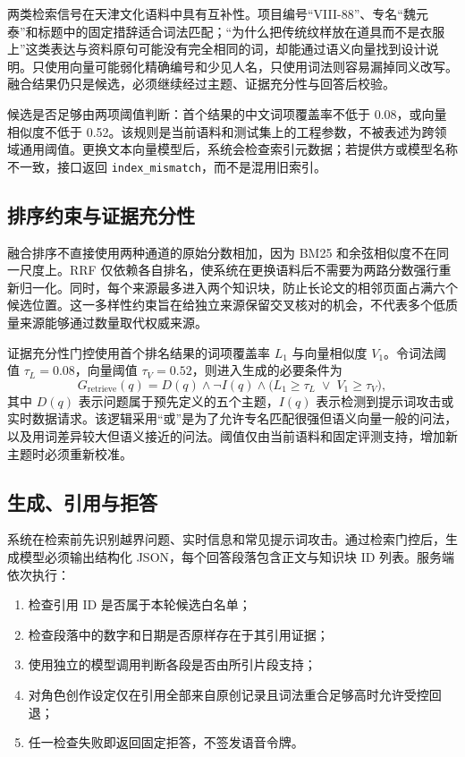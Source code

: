 \documentclass[UTF8,zihao=-4,fontset=none,twoside]{ctexart}
\newcommand{\code}[1]{\mbox{\texttt{#1}}\nobreak}
\begin{document}
两类检索信号在天津文化语料中具有互补性。项目编号“VIII-88”、专名“魏元泰”和标题中的固定措辞适合词法匹配；“为什么把传统纹样放在道具而不是衣服上”这类表达与资料原句可能没有完全相同的词，却能通过语义向量找到设计说明。只使用向量可能弱化精确编号和少见人名，只使用词法则容易漏掉同义改写。融合结果仍只是候选，必须继续经过主题、证据充分性与回答后校验。

候选是否足够由两项阈值判断：首个结果的中文词项覆盖率不低于 0.08，或向量相似度不低于 0.52。该规则是当前语料和测试集上的工程参数，不被表述为跨领域通用阈值。更换文本向量模型后，系统会检查索引元数据；若提供方或模型名称不一致，接口返回 \code{index\_mismatch}，而不是混用旧索引。

\subsection{排序约束与证据充分性}

融合排序不直接使用两种通道的原始分数相加，因为 BM25 和余弦相似度不在同一尺度上。RRF 仅依赖各自排名，使系统在更换语料后不需要为两路分数强行重新归一化。同时，每个来源最多进入两个知识块，防止长论文的相邻页面占满六个候选位置。这一多样性约束旨在给独立来源保留交叉核对的机会，不代表多个低质量来源能够通过数量取代权威来源。

证据充分性门控使用首个排名结果的词项覆盖率 $L_1$ 与向量相似度 $V_1$。令词法阈值 $\tau_L=0.08$，向量阈值 $\tau_V=0.52$，则进入生成的必要条件为
\begin{equation}
  G_{\mathrm{retrieve}}(q)=D(q)\land\neg I(q)\land
  \bigl(L_1\geq\tau_L\;\lor\;V_1\geq\tau_V\bigr),
  \label{eq:retrieval-gate}
\end{equation}
其中 $D(q)$ 表示问题属于预先定义的五个主题，$I(q)$ 表示检测到提示词攻击或实时数据请求。该逻辑采用“或”是为了允许专名匹配很强但语义向量一般的问法，以及用词差异较大但语义接近的问法。阈值仅由当前语料和固定评测支持，增加新主题时必须重新校准。

\subsection{生成、引用与拒答}

系统在检索前先识别越界问题、实时信息和常见提示词攻击。通过检索门控后，生成模型必须输出结构化 JSON，每个回答段落包含正文与知识块 ID 列表。服务端依次执行：
\begin{enumerate}
  \item 检查引用 ID 是否属于本轮候选白名单；
  \item 检查段落中的数字和日期是否原样存在于其引用证据；
  \item 使用独立的模型调用判断各段是否由所引片段支持；
  \item 对角色创作设定仅在引用全部来自原创记录且词法重合足够高时允许受控回退；
  \item 任一检查失败即返回固定拒答，不签发语音令牌。
\end{enumerate}
\end{document}
